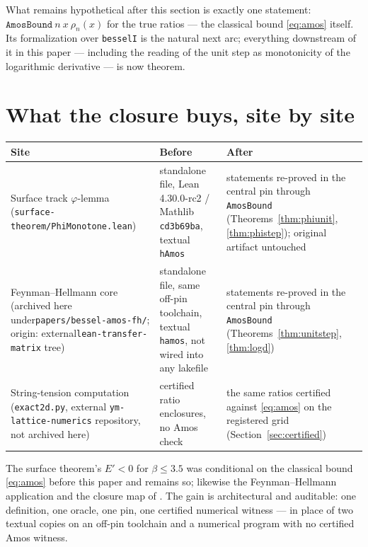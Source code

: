\documentclass[11pt]{article}
\newcommand{\lean}[1]{\texttt{#1}}
\begin{document}
What remains hypothetical after this section is exactly one
statement: $\lean{AmosBound}\ n\ x\ \rho_n(x)$ for the true ratios
--- the classical bound \eqref{eq:amos} itself.  Its formalization
over \lean{besselI} is the natural next arc; everything downstream
of it in this paper --- including the reading of the unit step as
monotonicity of the logarithmic derivative --- is now theorem.

\section{What the closure buys, site by site}\label{sec:sites}

\begin{center}
\small
\begin{tabular}{@{}p{}p{}p{}@{}}
\toprule
Site & Before & After \\
\midrule
Surface track $\varphi$-lemma
  (\lean{surface-theorem/}\newline\lean{PhiMonotone.lean}) &
standalone file, Lean 4.30.0-rc2 / Mathlib \lean{cd3b69ba}, textual
\lean{hAmos} &
statements re-proved in the central pin through \lean{AmosBound}
(Theorems~\ref{thm:phiunit}, \ref{thm:phistep}); original artifact
untouched \\
\addlinespace
Feynman--Hellmann core \cite{ErikssonFH26}
  (archived here under\newline\lean{papers/bessel-amos-fh/};\newline
  origin: external\newline\lean{lean-transfer-matrix} tree) &
standalone file, same off-pin toolchain, textual \lean{hamos},
not wired into any lakefile &
statements re-proved in the central pin through \lean{AmosBound}
(Theorems~\ref{thm:unitstep}, \ref{thm:logd}) \\
\addlinespace
String-tension computation
  (\lean{exact2d.py}, external \lean{ym-lattice-numerics}
  repository, not archived here) &
certified ratio enclosures, no Amos check &
the same ratios certified against \eqref{eq:amos} on the registered
grid (Section~\ref{sec:certified}) \\
\bottomrule
\end{tabular}
\end{center}

The surface theorem's $E' < 0$ for $\beta \le 3.5$ was conditional on
the classical bound \eqref{eq:amos} before this paper and remains so;
likewise the Feynman--Hellmann application \cite{ErikssonFH26} and
the closure map of \cite{ErikssonVM26}.  The gain is architectural
and auditable: one definition, one oracle, one pin, one certified
numerical witness --- in place of two textual copies on an off-pin
toolchain and a numerical program with no certified Amos witness.
\end{document}
